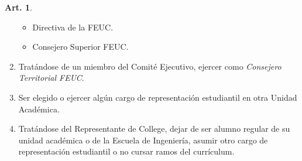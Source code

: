 \documentclass[letterpaper,11pt]{article}
\theoremstyle{definition}%
\newtheorem{art}{Art.} %
\begin{document}
\begin{art}
\begin{enumerate}
\begin{itemize}
			      \item Directiva de la FEUC\@.
			      \item Consejero Superior FEUC\@.
		      \end{itemize}
		\item Tratándose de un miembro del Comité Ejecutivo, ejercer como \emph{Consejero Territorial FEUC}.
		\item Ser elegido o ejercer algún cargo de representación estudiantil en otra Unidad Académica.
		\item Tratándose del Representante de College, dejar de ser alumno regular de su unidad académica o de la Escuela de Ingeniería, asumir otro cargo de representación estudiantil o no cursar ramos del currículum.
	\end{enumerate}
\end{art}
\end{document}
